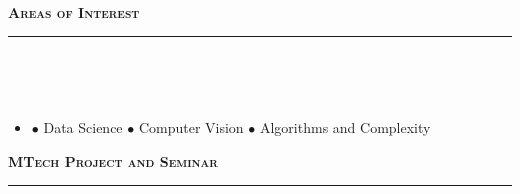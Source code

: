 \documentclass[a4paper,10pt]{article}
\newcommand{\lsep}{-0.5cm}
\newcommand{\resheading}[1]{{\small
        {
            \begin{minipage}
                {0.992\textwidth}\textbf{{\textsc{#1 \vphantom{p\^{E}} }}}
                \\[-0.3cm]
                \hrule
            \end{minipage}
            \\[-0.5cm]
        }
 }}
\begin{document}
\hspace{0.2cm}\\
\hspace{0.2cm}\\
\hspace{0.2cm}\\
\hspace{0.2cm}\\
\hspace{0.2cm}\\
\hspace{0.2cm}\\
\hspace{0.2cm}\\
\hspace{0.2cm}\\
\hspace{0.2cm}\\
\hspace{0.2cm}\\
\hspace{0.2cm}\\
\hspace{0.2cm}\\
\hspace{0.2cm}\\
\hspace{0.2cm}\\
\hspace{0.2cm}\\
\hspace{0.2cm}\\
\resheading{\textbf{\large Areas of Interest}}\\[\lsep]
    \begin{itemize}
    \item[] 
    \hspace{-0.4cm} $\bullet$ Data Science 
    \hspace{0.2cm} $\bullet$ Computer Vision
   \hspace{0.2cm} $\bullet$ Algorithms and Complexity
\end{itemize}
\resheading{\textbf{\large MTech Project and Seminar}}\\[\lsep] 
\end{document}
